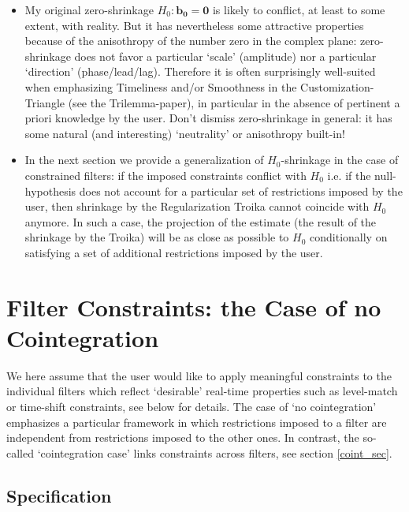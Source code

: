 \documentclass[11pt]{article}
\begin{document}
\begin{itemize}
\item My original zero-shrinkage $H_0: \mathbf{b_0=0}$ is likely to conflict, at least to some extent, with reality. But it has nevertheless some attractive properties because of the anisothropy of the number zero in the complex plane: zero-shrinkage does not favor a particular `scale' (amplitude) nor a particular `direction' (phase/lead/lag). Therefore it is often surprisingly well-suited when emphasizing Timeliness and/or Smoothness in the Customization-Triangle (see the Trilemma-paper), in particular in the absence of pertinent a priori knowledge by the user. Don't dismiss zero-shrinkage in general: it has some natural (and interesting) `neutrality' or anisothropy built-in!
\item In the next section  we provide a generalization of $H_0$-shrinkage in the case of constrained filters: if the imposed constraints conflict with $H_0$ i.e. if the null-hypothesis does not account for a particular set of restrictions imposed by the user, then shrinkage by the Regularization Troika cannot coincide with $H_0$ anymore. In such a case, the projection of the estimate (the result of the shrinkage by the Troika) will be as close as possible to $H_0$ conditionally on satisfying a set of  additional restrictions  imposed by the user.   
\end{itemize}



\section{Filter Constraints: the Case of no Cointegration}\label{fco}

We here assume that the user would like to apply meaningful constraints to the individual filters which reflect `desirable' real-time properties such as level-match or time-shift constraints, see below for details. The case of `no cointegration' emphasizes a particular framework in which restrictions imposed to a filter are independent from restrictions imposed to the other ones. In contrast, the so-called `cointegration case' links constraints across filters, see section \ref{coint_sec}. 

\subsection{Specification}
\end{document}
